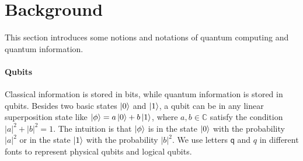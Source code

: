 \documentclass[runningheads]{llncs}
\begin{document}
\section{Background}
\label{Background}
This section introduces some notions and notations of quantum computing and quantum information.

\paragraph{Qubits}
Classical information is stored in bits, while quantum information is stored in qubits. 
Besides two basic states $\left\vert{0}\right\rangle$ and $\left\vert{1}\right\rangle$,
a qubit can be in any linear superposition state like $\left\vert{\phi}\right\rangle=a\left\vert{0}\right\rangle+b\left\vert{1}\right\rangle$,
where $a,b\in \mathbb{C}$ satisfy the condition $|a|^{2}+|b|^{2}=1$.
The intuition is that $\left\vert{\phi}\right\rangle$ is in the state $\left\vert{0}\right\rangle$ with the probability $|a|^{2}$ or in the state $\left\vert{1}\right\rangle$ with the probability $|b|^{2}$.
We use letters $\textsf{q}$ and $\textit{q}$ in different fonts to represent physical qubits and logical qubits.
\end{document}
